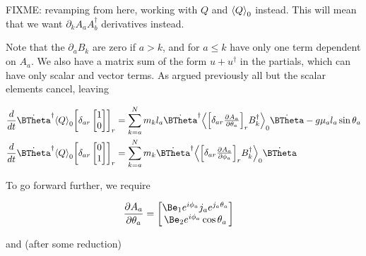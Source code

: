FIXME: revamping from here, working with $Q$ and ${\left\langle{{Q}}\right\rangle}_{0}$ instead.  This will mean that we want $\partial_k A_a A_b^\dagger$ derivatives instead.

Note that the $\partial_a B_k$ are zero if $a > k$, and for $a \le k$ have only one term dependent on $A_a$.  We also have a matrix sum of the form $u + u^\dagger$ in the partials, which can have only scalar and vector terms.  As argued previously all but the scalar elements cancel, leaving

\begin{align}\label{eqn:multiPendulumSpherical2:boo7}
\frac{d}{dt}
\dot{\BTheta}^\dagger
\gpgradezero{Q}
{\begin{bmatrix}
\delta_{ar}
\begin{bmatrix}
1 \\
0
\end{bmatrix}
\end{bmatrix}}_r
&=
\sum_{k=a}^N m_k l_a
\dot{\BTheta}^\dagger
\gpgradezero{
{\begin{bmatrix}
\delta_{ar}
\PD{\theta_a}{A_a} \\
\end{bmatrix}}_r
B_k^\dagger }
\dot{\BTheta}
-g \mu_a l_a \sin\theta_a \\
\frac{d}{dt}
\dot{\BTheta}^\dagger
\gpgradezero{Q}
{\begin{bmatrix}
\delta_{ar}
\begin{bmatrix}
0 \\
1
\end{bmatrix}
\end{bmatrix}}_r
&=
\sum_{k=a}^N m_k
\dot{\BTheta}^\dagger
\gpgradezero{
{\begin{bmatrix}
\delta_{ar}
\PD{\phi_a}{A_a} \\
\end{bmatrix}}_r
B_k^\dagger }
\dot{\BTheta}
\end{align}

To go forward further, we require

\begin{align}\label{eqn:multiPendulumSpherical2:boo10}
\PD{\theta_a}{A_a} &=
\begin{bmatrix}
\Be_1 e^{i \phi_a} j_a e^{j_a \theta_a} \\
\Be_2 e^{i \phi_a} \cos\theta_a
\end{bmatrix}
\end{align}

and (after some reduction)


